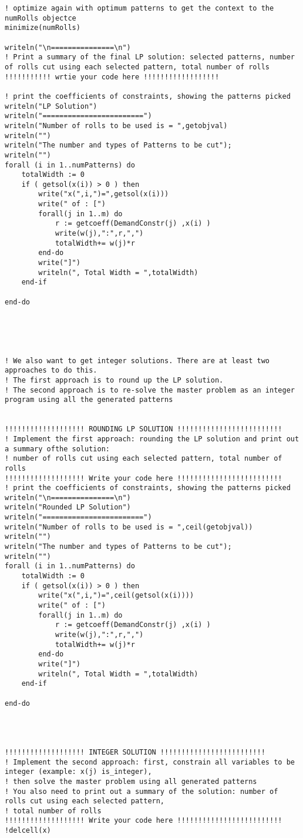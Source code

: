 \documentclass[twoside,12pt]{article}
\begin{document}
\begin{verbatim}
! optimize again with optimum patterns to get the context to the numRolls objectce
minimize(numRolls)

writeln("\n===============\n")
! Print a summary of the final LP solution: selected patterns, number of rolls cut using each selected pattern, total number of rolls
!!!!!!!!!!! wrtie your code here !!!!!!!!!!!!!!!!!!

! print the coefficients of constraints, showing the patterns picked
writeln("LP Solution")
writeln("========================")
writeln("Number of rolls to be used is = ",getobjval)
writeln("")
writeln("The number and types of Patterns to be cut");
writeln("")
forall (i in 1..numPatterns) do	
	totalWidth := 0
	if ( getsol(x(i)) > 0 ) then
		write("x(",i,")=",getsol(x(i)))
		write(" of : [")
		forall(j in 1..m) do
			r := getcoeff(DemandConstr(j) ,x(i) )
			write(w(j),":",r,",")
			totalWidth+= w(j)*r			
		end-do	
		write("]")
		writeln(", Total Width = ",totalWidth)
	end-if
	
end-do





! We also want to get integer solutions. There are at least two approaches to do this. 
! The first approach is to round up the LP solution.
! The second approach is to re-solve the master problem as an integer program using all the generated patterns 


!!!!!!!!!!!!!!!!!!! ROUNDING LP SOLUTION !!!!!!!!!!!!!!!!!!!!!!!!!
! Implement the first approach: rounding the LP solution and print out a summary ofthe solution: 
! number of rolls cut using each selected pattern, total number of rolls
!!!!!!!!!!!!!!!!!!! Write your code here !!!!!!!!!!!!!!!!!!!!!!!!!
! print the coefficients of constraints, showing the patterns picked
writeln("\n===============\n")
writeln("Rounded LP Solution")
writeln("========================")
writeln("Number of rolls to be used is = ",ceil(getobjval))
writeln("")
writeln("The number and types of Patterns to be cut");
writeln("")
forall (i in 1..numPatterns) do	
	totalWidth := 0
	if ( getsol(x(i)) > 0 ) then
		write("x(",i,")=",ceil(getsol(x(i))))
		write(" of : [")
		forall(j in 1..m) do
			r := getcoeff(DemandConstr(j) ,x(i) )
			write(w(j),":",r,",")
			totalWidth+= w(j)*r			
		end-do	
		write("]")
		writeln(", Total Width = ",totalWidth)
	end-if
	
end-do




!!!!!!!!!!!!!!!!!!! INTEGER SOLUTION !!!!!!!!!!!!!!!!!!!!!!!!!
! Implement the second approach: first, constrain all variables to be integer (example: x(j) is_integer), 
! then solve the master problem using all generated patterns
! You also need to print out a summary of the solution: number of rolls cut using each selected pattern, 
! total number of rolls
!!!!!!!!!!!!!!!!!!! Write your code here !!!!!!!!!!!!!!!!!!!!!!!!!
!delcell(x)


\end{verbatim}
\end{document}
